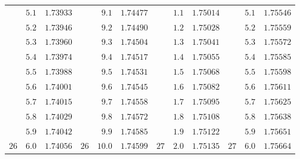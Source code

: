 \begin{center}
{\begin{tabular}{rr|r||rr|r||rr|r||rr|r}
 & $5.1$ & $1.73933$ &  & $9.1$ & $1.74477$ &  & $1.1$ & $1.75014$ &  & $5.1$ & $1.75546$\\
 & $5.2$ & $1.73946$ &  & $9.2$ & $1.74490$ &  & $1.2$ & $1.75028$ &  & $5.2$ & $1.75559$\\
 & $5.3$ & $1.73960$ &  & $9.3$ & $1.74504$ &  & $1.3$ & $1.75041$ &  & $5.3$ & $1.75572$\\
 & $5.4$ & $1.73974$ &  & $9.4$ & $1.74517$ &  & $1.4$ & $1.75055$ &  & $5.4$ & $1.75585$\\
 & $5.5$ & $1.73988$ &  & $9.5$ & $1.74531$ &  & $1.5$ & $1.75068$ &  & $5.5$ & $1.75598$\\
 & $5.6$ & $1.74001$ &  & $9.6$ & $1.74545$ &  & $1.6$ & $1.75082$ &  & $5.6$ & $1.75611$\\
 & $5.7$ & $1.74015$ &  & $9.7$ & $1.74558$ &  & $1.7$ & $1.75095$ &  & $5.7$ & $1.75625$\\
 & $5.8$ & $1.74029$ &  & $9.8$ & $1.74572$ &  & $1.8$ & $1.75108$ &  & $5.8$ & $1.75638$\\
 & $5.9$ & $1.74042$ &  & $9.9$ & $1.74585$ &  & $1.9$ & $1.75122$ &  & $5.9$ & $1.75651$\\[4pt]
$26$ & $6.0$ & $1.74056$ & $26$ & $10.0$ & $1.74599$ & $27$ & $2.0$ & $1.75135$ & $27$ & $6.0$ & $1.75664$
\end{tabular}}
\end{center}
\clearpage{}%

